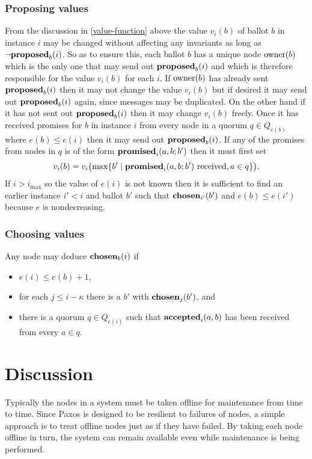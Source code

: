 \documentclass[journal]{IEEEtran}
\begin{document}
\subsubsection{Proposing values} From the discussion in \ref{value-function}
above the value $v_i(b)$ of ballot $b$ in instance $i$ may be changed without
affecting any invariants as long as $\neg\mathbf{proposed}_{b}(i)$. So as to ensure this,
each ballot $b$ has a unique node $\mathrm{owner}(b)$ which is the only one that may
send out $\mathbf{proposed}_{b}(i)$ and which is therefore responsible for the value
$v_i(b)$ for each $i$. If $\mathrm{owner}(b)$ has already sent $\mathbf{proposed}_{b}(i)$ then it
may not change the value $v_i(b)$ but if desired it may send out $\mathbf{proposed}_{b}(i)$
again, since messages may be duplicated. On the other hand if it has not sent
out $\mathbf{proposed}_{b}(i)$ then it may change $v_i(b)$ freely. Once it has received
promises for $b$ in instance $i$ from every node in a quorum $q \in Q_{e(b)}$
where $e(b) \le e(i)$ then it may send out $\mathbf{proposed}_{b}(i)$. If any of the
promises from nodes in $q$ is of the form $\mathbf{promised}_{i}(a,b;b')$ then it must
first set \[v_i(b) = v_i\bigl(\mathrm{max} \{b' \mid \mathbf{promised}_{i}(a,b;b')
\textrm{ received}, a \in q \}\bigr).\] If $i > i_\mathrm{max}$ so the value of
$e(i)$ is not known then it is sufficient to find an earlier instance $i' < i$
and ballot $b'$ such that $\mathbf{chosen}_{i'}(b')$ and $e(b) \le e(i')$ because $e$
is nondecreasing.

\subsubsection{Choosing values} Any node may deduce $\mathbf{chosen}_{b}(i)$ if
\begin{itemize} \item $e(i) \le e(b) + 1$, \item for each $j \le i - \kappa$
there is a $b'$ with $\mathbf{chosen}_{j}(b')$, and \item there is a quorum $q \in
Q_{e(i)}$ such that $\mathbf{accepted}_{i}(a,b)$ has been received from every $a \in q$.
\end{itemize}

\section{Discussion}\label{discussion}

Typically the nodes in a system must be taken offline for maintenance from time
to time. Since Paxos is designed to be resilient to failures of nodes, a simple
approach is to treat offline nodes just as if they have failed. By taking each
node offline in turn, the system can remain available even while maintenance is
being performed.
\end{document}
